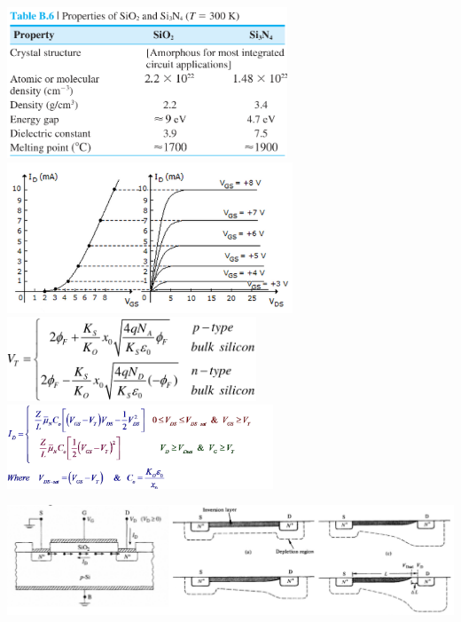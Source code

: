 \documentclass{article}
\begin{document}
\begin{center}
    \includegraphics[align=c, height=4.5cm]{oxides.png}
    \includegraphics[align=c, height=4.5cm]{mosfetcurves.png}
    \includegraphics[align=c, height=2.5cm]{mosfetthreshold.png}
    \includegraphics[align=c, height=2.5cm]{mosfetdrain.png}
    \includegraphics[align=c, height=4cm]{mosfetdiagram.png}
\end{center}
\end{document}
